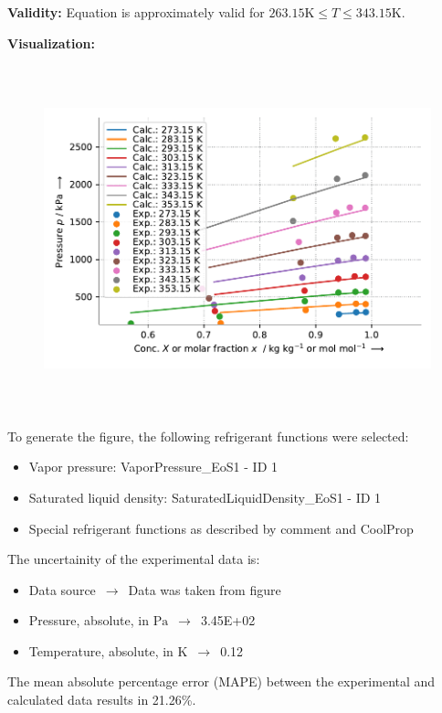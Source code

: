 \textbf{Validity:}
\newline
Equation is approximately valid for $263.15 \si{\kelvin} \leq T \leq 343.15 \si{\kelvin}$.
\newline

\textbf{Visualization:}
%
\begin{figure}[!htp]
{\noindent\includegraphics[height=10cm, keepaspectratio]{figs/abs/abs_R-134a_lubricant_PAG_Heil_1.pdf}}
\end{figure}
%

To generate the figure, the following refrigerant functions were selected:
\begin{itemize}
\item Vapor pressure: VaporPressure\_EoS1 - ID 1
\item Saturated liquid density: SaturatedLiquidDensity\_EoS1 - ID 1
\item Special refrigerant functions as described by comment and CoolProp
\end{itemize}

The uncertainity of the experimental data is:
\begin{itemize}
\item Data source $\,\to\,$ Data was taken from figure
\item Pressure, absolute, in $\si{\pascal}$ $\,\to\,$ 3.45E+02
\item Temperature, absolute, in $\si{\kelvin}$ $\,\to\,$ 0.12
\end{itemize}

The mean absolute percentage error (MAPE) between the experimental and calculated data results in 21.26\%.
\FloatBarrier
\newpage
